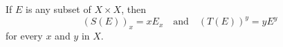 If $E$ is any subset of $X \times X$, then
$$(S(E))_x = xE_x \quad \text{and} \quad (T(E))^y = yE^y$$
for every $x$ and $y$ in $X$.
